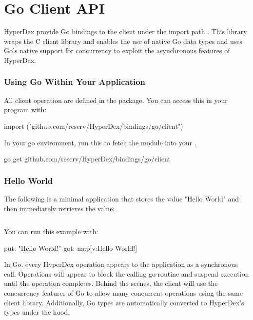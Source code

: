 \chapter{Go Client API}
\label{chap:api:go-client}

HyperDex provide Go bindings to the client under the import path
.  This library wraps the C
client library and enables the use of native Go data types and uses Go's native
support for concurrency to exploit the asynchronous features of HyperDex.

\subsection{Using Go Within Your Application}
\label{sec:api:go-client:using}

All client operation are defined in the  package.  You can
access this in your program with:

\begin{gocode}
import ("github.com/rescrv/HyperDex/bindings/go/client")
\end{gocode}

In your go environment, run this to fetch the module into your .

\begin{consolecode}
go get github.com/rescrv/HyperDex/bindings/go/client
\end{consolecode}

\subsection{Hello World}
\label{sec:api:go-client:hello-world}

The following is a minimal application that stores the value "Hello World" and
then immediately retrieves the value:

\inputminted{go}{\topdir/go/client/hello-world.go}

You can run this example with:

\begin{consolecode}
put: "Hello World!"
got: map[v:Hello World!]
\end{consolecode}

In Go, every HyperDex operation appears to the application as a synchronous
call.  Operations will appear to block the calling go-routine and suspend
execution until the operation completes.  Behind the scenes, the client will use
the concurrency features of Go to allow many concurrent operations using the
same client library.  Additionally, Go types are automatically converted to
HyperDex's types under the hood.

